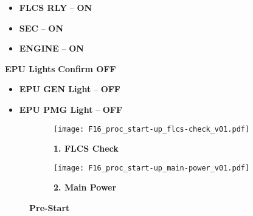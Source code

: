 \begin{tablenumerate}
{\begin{subenumerate}
\begin{itemize}
            \item \textbf{FLCS RLY} -- \textbf{ON}
            \item \textbf{SEC} -- \textbf{ON}
            \item \textbf{ENGINE} -- \textbf{ON}
        \end{itemize}
        \item \textbf{EPU Lights} \dotfill \textbf{Confirm OFF}
        \begin{itemize}
            \item \textbf{EPU GEN Light} -- \textbf{OFF}
            \item \textbf{EPU PMG Light} -- \textbf{OFF}
        \end{itemize}
    \end{subenumerate}}
\end{tablenumerate}


\begin{figure}[h]
    \centering
    \begin{subfigure}[t]{0.45\linewidth}
        \centering
        \texttt{[image: F16\_proc\_start-up\_flcs-check\_v01.pdf]}
        \caption*{\textbf{1. FLCS Check}}
        \label{fig:proc:prestart:flcscheck}
    \end{subfigure}
    \begin{subfigure}[t]{0.45\linewidth}
        \centering
        \texttt{[image: F16\_proc\_start-up\_main-power\_v01.pdf]}
        \caption*{\textbf{2. Main Power}}
        \label{fig:proc:prestart:mainpower}
    \end{subfigure}
    \caption{\textbf{Pre-Start}}
    \label{fig:proc:prestart}
\end{figure}

\clearpage


